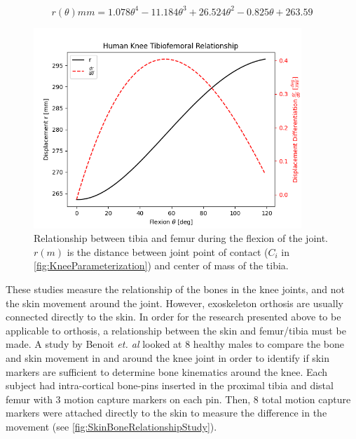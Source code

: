 \begin{equation}
    r(\theta) mm = 1.078\theta^4 - 11.184\theta^3 + 26.524\theta^2 - 0.825\theta + 263.59
    \label{eq:TibiofemoralRelationship}
\end{equation}

\begin{figure}[ht!]
    \centering
    \includegraphics[width=0.9\textwidth]{Figures/Background/FlexionCurve.png}
    \caption{Relationship between tibia and femur during the flexion of the joint. \(r(m)\) is the distance between joint point of contact (\(C_i\) in \autoref{fig:KneeParameterization}) and center of mass of the tibia.}
    \label{fig:KneeFlexionCurve}
\end{figure}

These studies measure the relationship of the bones in the knee joints, and not the skin movement around the joint. However, exoskeleton orthosis are usually connected directly to the skin. In order for the research presented above to be applicable to orthosis, a relationship between the skin and femur/tibia must be made. A study by Benoit \textit{et. al} looked at 8 healthy males to compare the bone and skin movement in and around the knee joint in order to identify if skin markers are sufficient to determine bone kinematics around the knee. Each subject had intra-cortical bone-pins inserted in the proximal tibia and distal femur with 3 motion capture markers on each pin. Then, 8 total motion capture markers were attached directly to the skin to measure the difference in the movement (see \autoref{fig:SkinBoneRelationshipStudy}). 

